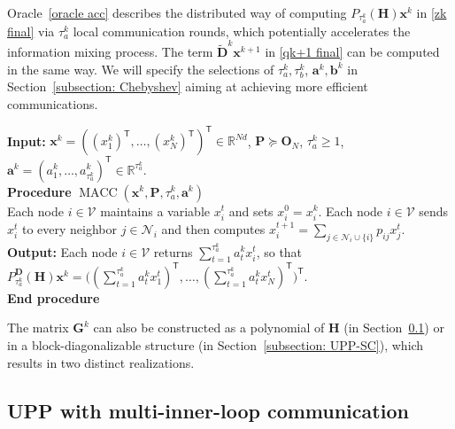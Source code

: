 \documentclass[12pt,draftcls,onecolumn]{IEEEtran}
\renewcommand{\Re}{{\mathbb{R}}}
\newcommand{\bx}{{\mathbf{x}}}
\newcommand{\bG}{{\mathbf{G}}}
\newcommand{\bH}{{\mathbf{H}}}
\newcommand{\bD}{{\mathbf{D}}}
\begin{document}
Oracle~\ref{oracle acc} describes the distributed way of computing $P_{\tau_a^k}(\mathbf{H})\mathbf{x}^k$ in \eqref{zk final} via $\tau_a^k$ local communication rounds, which potentially accelerates the information mixing process. The term $\tilde{\bD}^k\bx^{k+1}$ in \eqref{qk+1 final} can be computed in the same way. We will specify the selections of $\tau_a^k,\tau_b^k$, $\mathbf{a}^k,\mathbf{b}^k$ in Section~\ref{subsection: Chebyshev} aiming at achieving more efficient communications. 

\begin{algorithm}[h] 
        \renewcommand{\thealgorithm}{$\mathcal{A}$}
        \caption{: Mixing Acceleration} \label{oracle acc}
        \begin{algorithmic}[1]
                \STATE \textbf{Input:} $\mathbf{x}^k=((x_1^k)^{\mathsf{T}},\ldots,(x_N^k)^{\mathsf{T}})^{\mathsf{T}}\in \Re^{Nd}$, $\mathbf{P}\succeq\mathbf{O}_N$, $\tau_a^k\geq 1$, $\mathbf{a}^k=(a_1^k,\dots,a_{\tau_a^k}^k)^{\mathsf{T}}\in\Re^{\tau_a^k}$.\\ 
                \STATE \textbf{Procedure} $\operatorname{MACC}(\mathbf{x}^k,\mathbf{P},\tau_a^k,\mathbf{a}^k)$ \\
				\STATE Each node $i \in \mathcal{V}$ maintains a variable $x_i^{t}$ and sets $x_i^0=x_i^k$.
                \STATE Each node $i \in \mathcal{V}$ sends $x_i^{t}$ to every neighbor $j\in\mathcal{N}_i$ and then computes $x_i^{t+1}= \sum_{j\in {\mathcal{N}}_i \cup \{i\}} p_{ij} x_j^{t}$.\\
                \ENDFOR
                \STATE \textbf{Output:} Each node $i \in \mathcal{V}$ returns $\sum_{t=1}^{\tau_a^k}a_t^kx_i^t$, so that $P_{\tau_a^k}^\bD(\mathbf{H})\mathbf{x}^k=\big((\sum_{t=1}^{\tau_a^k}a_t^kx_1^t)^{\mathsf{T}},\ldots,(\sum_{t=1}^{\tau_a^k}a_t^kx_N^t)^{\mathsf{T}}\big)^{\mathsf{T}}$.\\
                \STATE \textbf{End procedure}\\
        \end{algorithmic}
\end{algorithm}

The matrix $\bG^k$ can also be constructed as a polynomial of $\bH$ (in Section~\ref{subsection: UPP-MC}) or in a block-diagonalizable structure (in Section~\ref{subsection: UPP-SC}), which results in two distinct realizations.


\subsection{UPP with multi-inner-loop communication} \label{subsection: UPP-MC}
\end{document}
